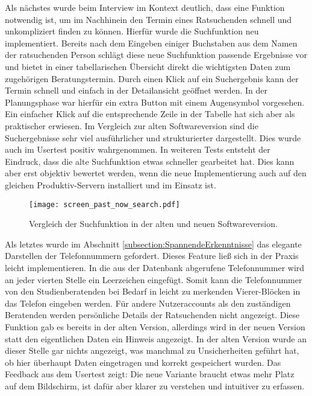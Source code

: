Als nächstes wurde beim Interview im Kontext deutlich, dass eine Funktion
notwendig ist, um im Nachhinein den Termin eines Ratsuchenden schnell und
unkompliziert finden zu können. Hierfür wurde die Suchfunktion neu
implementiert. Bereits nach dem Eingeben einiger Buchstaben aus dem Namen der
ratsuchenden Person schlägt diese neue Suchfunktion passende Ergebnisse vor und
bietet in einer tabellarischen Übersicht direkt die wichtigsten Daten zum
zugehörigen Beratungstermin. Durch einen Klick auf ein Suchergebnis kann der
Termin schnell und einfach in der Detailansicht geöffnet werden. In der
Planungsphase war hierfür ein extra Button mit einem Augensymbol vorgesehen.
Ein einfacher Klick auf die entsprechende Zeile in der Tabelle hat sich aber
als praktischer erwiesen. Im Vergleich zur alten Softwareversion sind die
Suchergebnisse sehr viel ausführlicher und strukturierter dargestellt. Dies
wurde auch im Usertest positiv wahrgenommen. In weiteren Tests entsteht der
Eindruck, dass die alte Suchfunktion etwas schneller gearbeitet hat. Dies kann
aber erst objektiv bewertet werden, wenn die neue Implementierung auch auf den
gleichen Produktiv-Servern installiert und im Einsatz ist.

\begin{figure}[H]
    \caption{Vergleich der Suchfunktion in der alten und neuen Softwareversion.}
    \centering
    \texttt{[image: screen\_past\_now\_search.pdf]}
\end{figure}

Als letztes wurde im Abschnitt \ref{subsection:SpannendeErkenntnisse} das
elegante Darstellen der Telefonnummern gefordert. Dieses Feature ließ sich in
der Praxis leicht implementieren. In die aus der Datenbank abgerufene 
Telefonnummer wird an jeder vierten Stelle ein Leerzeichen eingefügt. Somit
kann die Telefonnummer von den Studienberatenden bei Bedarf in leicht zu
merkenden Vierer-Blöcken in das Telefon eingeben werden. Für andere
Nutzeraccounts als den zuständigen Beratenden werden persönliche Details der
Ratsuchenden nicht angezeigt. Diese Funktion gab es bereits in der alten Version, allerdings wird in der neuen Version statt den eigentlichen Daten ein
Hinweis angezeigt. In der alten Version wurde an dieser Stelle gar nichts
angezeigt, was manchmal zu Unsicherheiten geführt hat, ob hier überhaupt Daten
eingetragen und korrekt gespeichert wurden. Das Feedback aus dem Usertest
zeigt: Die neue Variante braucht etwas mehr Platz auf dem Bildschirm, ist dafür
aber klarer zu verstehen und intuitiver zu erfassen.


